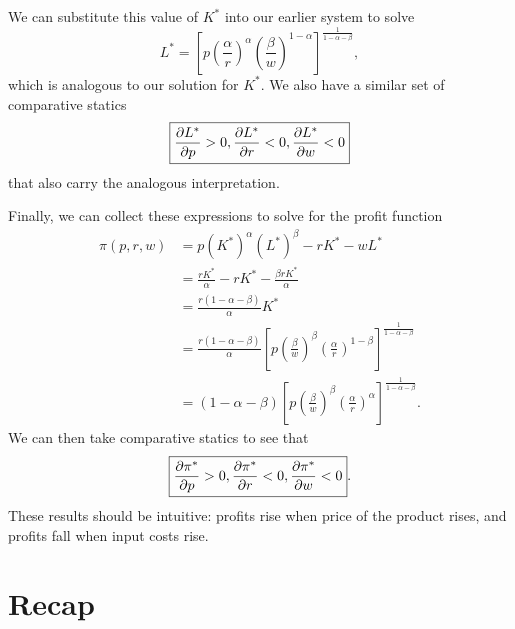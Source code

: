 We can substitute this value of $K^*$ into our earlier system to solve
$$\boxed{L^* = \left[p\left(\frac{\alpha}{r}\right)^{\alpha} \left(\frac{\beta}{w}\right)^{1-\alpha} \right]^{\frac{1}{1-\alpha-\beta}},}$$
which is analogous to our solution for $K^*$. We also have a similar set of comparative statics
$$\boxed{\pdv{L^*}{p}>0, \pdv{L^*}{r}<0, \pdv{L^*}{w}<0}$$
that also carry the analogous interpretation.

Finally, we can collect these expressions to solve for the profit function
\begin{align*}
\pi(p, r, w) &= p (K^*)^{\alpha} (L^*)^{\beta} - rK^* - wL^* \\
&= \frac{rK^*}{\alpha} - rK^* - \frac{\beta r K^*}{\alpha} \\
&= \frac{r(1-\alpha-\beta)}{\alpha}K^* \\
&= \frac{r(1-\alpha-\beta)}{\alpha}\left[p\left(\frac{\beta}{w}\right)^{\beta} \left(\frac{\alpha}{r}\right)^{1-\beta} \right]^{\frac{1}{1-\alpha-\beta}} \\
&= \boxed{(1-\alpha-\beta)\left[p\left(\frac{\beta}{w}\right)^{\beta} \left(\frac{\alpha}{r}\right)^{\alpha} \right]^{\frac{1}{1-\alpha-\beta}}.}
\end{align*}
We can then take comparative statics to see that
$$\boxed{\pdv{\pi^*}{p}>0, \pdv{\pi^*}{r}<0, \pdv{\pi^*}{w}<0}.$$
These results should be intuitive: profits rise when price of the product rises, and profits fall when input costs rise.


\section*{Recap}

